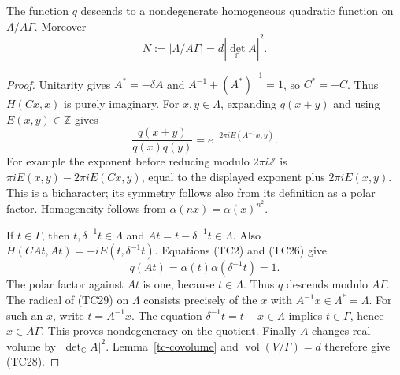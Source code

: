 \begin{lemma}\label{tc-cayley-quadratic}
The function $q$ descends to a nondegenerate homogeneous
quadratic function on $\Lambda/A\Gamma$.  Moreover
\[
                 N:=|\Lambda/A\Gamma|=d|\det_{\mathbb C}A|^2.
 \tag{TC28}
\]
\end{lemma}
\begin{proof}
Unitarity gives
$A^*=-\delta A$ and $A^{-1}+(A^*)^{-1}=1$,
so $C^*=-C$.
Thus $H(Cx,x)$ is purely imaginary.  For $x,y\in\Lambda$,
expanding $q(x+y)$ and using $E(x,y)\in\mathbb Z$ gives
\[
 \frac{q(x+y)}{q(x)q(y)}
                   =e^{-2\pi iE(A^{-1}x,y)}.
 \tag{TC29}
\]
For example the exponent before reducing modulo $2\pi i\mathbb Z$
is $\pi iE(x,y)-2\pi iE(Cx,y)$, equal to the displayed
exponent plus $2\pi iE(x,y)$.
This is a bicharacter; its symmetry follows also from its
definition as a polar factor.  Homogeneity follows from
$\alpha(nx)=\alpha(x)^{n^2}$.

If $t\in\Gamma$, then $t,\delta^{-1}t\in\Lambda$ and
$At=t-\delta^{-1}t\in\Lambda$.
Also
$H(CAt,At)=-iE(t,\delta^{-1}t)$.
Equations (TC2) and (TC26) give
\[
 q(At)=\alpha(t)\alpha(\delta^{-1}t)=1.
 \tag{TC30}
\]
The polar factor against $At$ is one, because $t\in\Lambda$.
Thus $q$ descends modulo $A\Gamma$.
The radical of (TC29) on $\Lambda$ consists precisely of
the $x$ with $A^{-1}x\in\Lambda^*=\Lambda$.
For such an $x$, write $t=A^{-1}x$.
The equation $\delta^{-1}t=t-x\in\Lambda$ implies
$t\in\Gamma$, hence $x\in A\Gamma$.
This proves nondegeneracy on the quotient.
Finally $A$ changes real volume by $|\det_{\mathbb C}A|^2$.
Lemma~\ref{tc-covolume} and $\operatorname{vol}(V/\Gamma)=d$
therefore give (TC28).
\end{proof}

